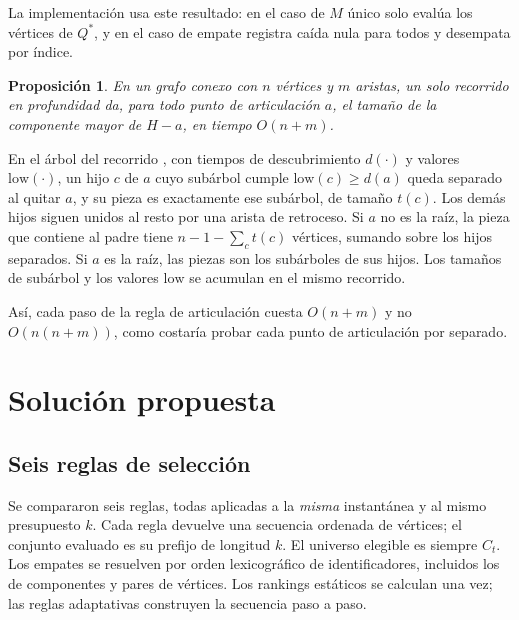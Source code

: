 \documentclass[journal]{IEEEtran}
\newtheorem{proposicion}{Proposición}
\begin{document}
La implementación usa este resultado: en el caso de $M$ único solo evalúa los
vértices de $Q^\ast$, y en el caso de empate registra caída nula para todos y
desempata por índice.

\begin{proposicion}\label{prop:tarjan}
En un grafo conexo con $n$ vértices y $m$ aristas, un solo recorrido en
profundidad da, para todo punto de articulación $a$, el tamaño de la
componente mayor de $H-a$, en tiempo $O(n+m)$.
\end{proposicion}

\begin{IEEEproof}[Prueba]
En el árbol del recorrido \cite{tarjan1972depth}, con tiempos de
descubrimiento $d(\cdot)$ y valores $\mathrm{low}(\cdot)$, un hijo $c$ de $a$
cuyo subárbol cumple $\mathrm{low}(c)\geq d(a)$ queda separado al quitar $a$,
y su pieza es exactamente ese subárbol, de tamaño $t(c)$. Los demás hijos
siguen unidos al resto por una arista de retroceso. Si $a$ no es la raíz, la
pieza que contiene al padre tiene $n-1-\sum_c t(c)$ vértices, sumando sobre
los hijos separados. Si $a$ es la raíz, las piezas son los subárboles de sus
hijos. Los tamaños de subárbol y los valores $\mathrm{low}$ se acumulan en el
mismo recorrido.
\end{IEEEproof}

Así, cada paso de la regla de articulación cuesta $O(n+m)$ y no
$O(n(n+m))$, como costaría probar cada punto de articulación por separado.

\section{Solución propuesta}

\subsection{Seis reglas de selección}
\label{sec:reglas}

Se compararon seis reglas, todas aplicadas a la \emph{misma} instantánea y al
mismo presupuesto $k$. Cada regla devuelve una secuencia ordenada de vértices;
el conjunto evaluado es su prefijo de longitud $k$. El universo elegible es
siempre $C_t$. Los empates se resuelven por orden lexicográfico de identificadores,
incluidos los de componentes y pares de vértices. Los rankings estáticos se
calculan una vez; las reglas adaptativas construyen la secuencia paso a paso.
\end{document}
